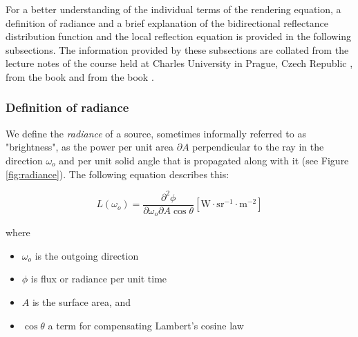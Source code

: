 For a better understanding of the individual terms of the rendering equation, a definition of radiance and a brief explanation of the bidirectional reflectance distribution function and the local reflection equation is provided in the following subsections.
The information provided by these subsections are collated from the lecture notes of the course  held at Charles University in Prague, Czech Republic \cite{cg3}, from the book  \cite{pharr2016physically} and from the book  \cite{hughesDamEtAl13}.

\subsubsection{Definition of radiance}

We define the \emph{radiance} of a source, sometimes informally referred to as "brightness", as the power per unit area $\partial A$ perpendicular to the ray in the direction $\omega_{o}$ and per unit solid angle that is propagated along with it (see Figure \ref{fig:radiance}). The following equation describes this:

\begin{equation}
L(\omega_{o}) = \frac{\partial^2\phi}{\partial\omega_{o}\partial A\cos\theta} [\mathrm{W}\cdot \mathrm{sr}^{-1}\cdot \mathrm{m}^{-2}]
\end{equation}

\noindent where
\begin{itemize}
	\setlength\itemsep{0.05em}
	\item  $\omega_{o}$ is the outgoing direction
	\item  $\phi$ is flux or radiance per unit time
	\item  $A$ is the surface area, and
	\item  $\cos\theta$ a term for compensating Lambert's cosine law
\end{itemize}

